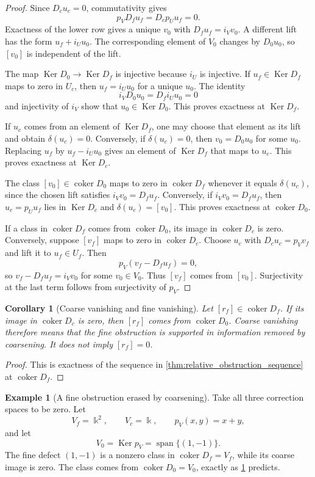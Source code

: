 \documentclass{aomart}
\newtheorem{corollary}[corollary]{Corollary}
\theoremstyle{definition}
\newtheorem{example}[example]{Example}
\theoremstyle{remark}
\newcommand{\bbk}{\Bbbk}
\newcommand{\Ker}{\operatorname{Ker}}
\newcommand{\coker}{\operatorname{coker}}
\newcommand{\Span}{\operatorname{span}}
\begin{document}
\begin{proof}
Since $D_cu_c=0$, commutativity gives
\[
p_VD_fu_f=D_cp_Uu_f=0.
\]
Exactness of the lower row gives a unique $v_0$ with $D_fu_f=i_Vv_0$.  A different lift has the form $u_f+i_Uu_0$.  The corresponding element of $V_0$ changes by $D_0u_0$, so $[v_0]$ is independent of the lift.

The map $\Ker D_0\to\Ker D_f$ is injective because $i_U$ is injective.  If $u_f\in\Ker D_f$ maps to zero in $U_c$, then $u_f=i_Uu_0$ for a unique $u_0$.  The identity
\[
i_VD_0u_0=D_fi_Uu_0=0
\]
and injectivity of $i_V$ show that $u_0\in\Ker D_0$.  This proves exactness at $\Ker D_f$.

If $u_c$ comes from an element of $\Ker D_f$, one may choose that element as its lift and obtain $\delta(u_c)=0$.  Conversely, if $\delta(u_c)=0$, then $v_0=D_0u_0$ for some $u_0$.  Replacing $u_f$ by $u_f-i_Uu_0$ gives an element of $\Ker D_f$ that maps to $u_c$.  This proves exactness at $\Ker D_c$.

The class $[v_0]\in\coker D_0$ maps to zero in $\coker D_f$ whenever it equals $\delta(u_c)$, since the chosen lift satisfies $i_Vv_0=D_fu_f$.  Conversely, if $i_Vv_0=D_fu_f$, then $u_c=p_Uu_f$ lies in $\Ker D_c$ and $\delta(u_c)=[v_0]$.  This proves exactness at $\coker D_0$.

If a class in $\coker D_f$ comes from $\coker D_0$, its image in $\coker D_c$ is zero.  Conversely, suppose $[v_f]$ maps to zero in $\coker D_c$.  Choose $u_c$ with $D_cu_c=p_Vv_f$ and lift it to $u_f\in U_f$.  Then
\[
p_V(v_f-D_fu_f)=0,
\]
so $v_f-D_fu_f=i_Vv_0$ for some $v_0\in V_0$.  Thus $[v_f]$ comes from $[v_0]$.  Surjectivity at the last term follows from surjectivity of $p_V$.
\end{proof}

\begin{corollary}[Coarse vanishing and fine vanishing]\label{cor:coarse_fine_obstruction}
Let $[r_f]\in\coker D_f$.  If its image in $\coker D_c$ is zero, then $[r_f]$ comes from $\coker D_0$.  Coarse vanishing therefore means that the fine obstruction is supported in information removed by coarsening.  It does not imply $[r_f]=0$.
\end{corollary}

\begin{proof}
This is exactness of the sequence in \cref{thm:relative_obstruction_sequence} at $\coker D_f$.
\end{proof}

\begin{example}[A fine obstruction erased by coarsening]\label{ex:coarse_cancellation}
Take all three correction spaces to be zero.  Let
\[
V_f=\bbk^2,
\qquad
V_c=\bbk,
\qquad
p_V(x,y)=x+y,
\]
and let
\[
V_0=\Ker p_V=\Span\{(1,-1)\}.
\]
The fine defect $(1,-1)$ is a nonzero class in $\coker D_f=V_f$, while its coarse image is zero.  The class comes from $\coker D_0=V_0$, exactly as \cref{cor:coarse_fine_obstruction} predicts.
\end{example}
\end{document}
